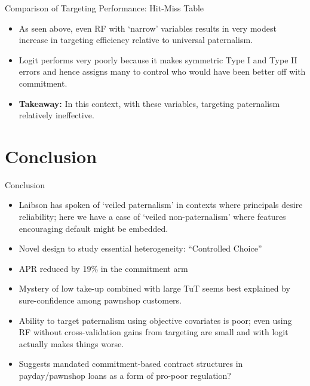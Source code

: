 \documentclass[8pt]{beamer}
\begin{document}
\begin{frame}{Comparison of Targeting Performance:  Hit-Miss Table}


\begin{table}[H]
\caption{Type I \& II errors using targeting narrow rules}
\label{hit_miss_rule}
\begin{center}
\resizebox{0.95\textwidth}{!}{
\small{}
}
\end{center}
\end{table} 
     

\begin{itemize}
    \item   As seen above, even RF with `narrow' variables results in very modest increase in targeting efficiency relative to universal paternalism.
    \item  Logit performs very poorly because it makes symmetric Type I and Type II errors and hence assigns many to control who would have been better off with commitment.
    \item  \textbf{Takeaway:}  In this context, with these variables, targeting paternalism relatively ineffective.
\end{itemize}        


\end{frame}

\section{Conclusion}
\begin{frame}{Conclusion}
    \begin{itemize}
     \vfill \item Laibson has spoken of `veiled paternalism' in contexts where principals desire reliability; here we have a case of `veiled non-paternalism' where features encouraging default might be embedded.
     \vfill \item Novel design to study essential heterogeneity: ``Controlled Choice''
        \vfill \item  APR reduced by 19\% in the commitment arm
        \vfill \item Mystery of low take-up combined with large TuT seems best explained by sure-confidence among pawnshop customers.
        \vfill\item  Ability to target paternalism using objective covariates is poor; even using RF without cross-validation gains from targeting are small and with logit actually makes things worse.
        \vfill \item Suggests mandated commitment-based contract structures in payday/pawnshop loans as a form of pro-poor regulation?
    \end{itemize}  
\end{frame}
\end{document}
